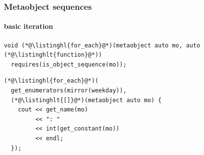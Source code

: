 \documentclass[aspectratio=169,compress,table,xcolor=table]{beamer}
\begin{document}
\begin{frame}[fragile]
  \frametitle{Metaobject sequences}
  \framesubtitle{basic iteration}
  \begin{lstlisting}[language=c++2x,basicstyle=\normalsize\ttfamily]
void (*@\listinghl{for_each}@*)(metaobject auto mo, auto (*@\listinghlt{function}@*))
  requires(is_object_sequence(mo));
  \end{lstlisting}
  \begin{lstlisting}[language=c++2x]
(*@\listinghl{for_each}@*)(
  get_enumerators(mirror(weekday)),
  (*@\listinghlt{[]}@*)(metaobject auto mo) {
    cout << get_name(mo)
         << ": "
         << int(get_constant(mo))
         << endl;
  });
  \end{lstlisting}
\end{frame}
\end{document}

